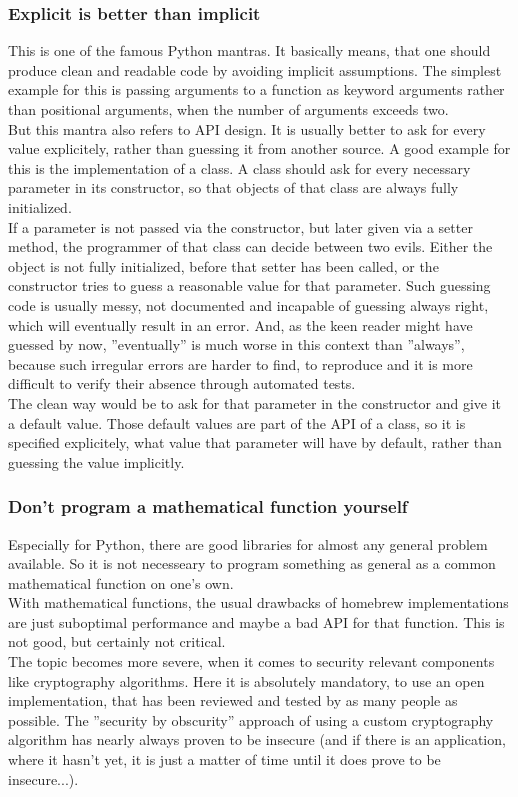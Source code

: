 		\subsubsection{Explicit is better than implicit}
			This is one of the famous Python mantras.
			It basically means, that one should produce clean and readable code by avoiding implicit assumptions.
			The simplest example for this is passing arguments to a function as keyword arguments rather than positional arguments, when the number of arguments exceeds two.\\
			But this mantra also refers to API design.
			It is usually better to ask for every value explicitely, rather than guessing it from another source.
			A good example for this is the implementation of a class.
			A class should ask for every necessary parameter in its constructor, so that objects of that class are always fully initialized.\\
			If a parameter is not passed via the constructor, but later given via a setter method, the programmer of that class can decide between two evils.
			Either the object is not fully initialized, before that setter has been called, or the constructor tries to guess a reasonable value for that parameter.
			Such guessing code is usually messy, not documented and incapable of guessing always right, which will eventually result in an error.
			And, as the keen reader might have guessed by now, ''eventually'' is much worse in this context than ''always'', because such irregular errors are harder to find, to reproduce and it is more difficult to verify their absence through automated tests.\\
			The clean way would be to ask for that parameter in the constructor and give it a default value.
			Those default values are part of the API of a class, so it is specified explicitely, what value that parameter will have by default, rather than guessing the value implicitly.

		\subsubsection{Don't program a mathematical function yourself}
			Especially for Python, there are good libraries for almost any general problem available.
			So it is not necesseary to program something as general as a common mathematical function on one's own.\\
			With mathematical functions, the usual drawbacks of homebrew implementations are just suboptimal performance and maybe a bad API for that function.
			This is not good, but certainly not critical.\\
			The topic becomes more severe, when it comes to security relevant components like cryptography algorithms.
			Here it is absolutely mandatory, to use an open implementation, that has been reviewed and tested by as many people as possible.
			The ''security by obscurity'' approach of using a custom cryptography algorithm has nearly always proven to be insecure (and if there is an application, where it hasn't yet, it is just a matter of time until it does prove to be insecure...).

